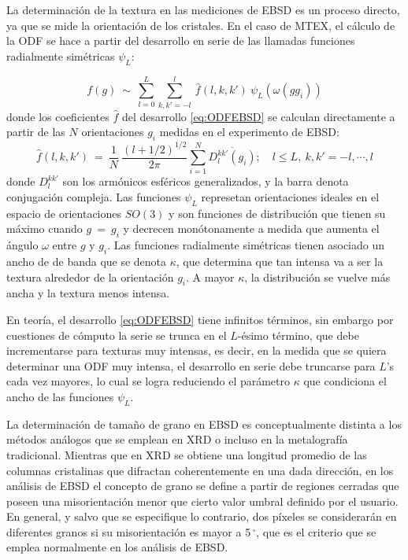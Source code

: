 La determinación de la textura en las mediciones de EBSD es un proceso directo, ya que se mide la orientación de los cristales.
En el caso de MTEX, el cálculo de la ODF se hace a partir del desarrollo en serie de las llamadas funciones radialmente simétricas $\psi_L$:

\begin{equation}
  f(g) \ \sim \ \sum_{l=0}^{L} \sum_{k,k'=-l}^{l} \ \hat{f}(l, k, k') \ \psi_L(\omega(gg_i)) 
  \label{eq:ODFEBSD}
\end{equation}
\noindent
donde los coeficientes $\hat{f}$ del desarrollo \ref{eq:ODFEBSD} se calculan directamente a partir de las $N$ orientaciones $g_i$ medidas en el experimento de EBSD:
\begin{equation}
  \hat{f}(l, k, k') \ = \ \frac{1}{N} \ \frac{(l + 1/2)^{1/2}}{2 \pi} \sum_{i=1}^{N} \overline{D_l^{k k'} (g_i)}; \quad l \leq L, \ k, k' = -l, \cdots, l
  \label{eq:ODFcoef}
\end{equation}
\noindent
donde $D_l^{k k'}$ son los armónicos esféricos generalizados, y la barra denota conjugación compleja. Las funciones $\psi_L$ represetan orientaciones ideales en el espacio de orientaciones $SO(3)$ y son funciones de distribución que tienen su máximo cuando $g \ = \ g_i$ y decrecen monótonamente a medida que aumenta el ángulo $\omega$ entre $g$ y $g_i$.
Las funciones radialmente simétricas tienen asociado un ancho de de banda que se denota $\kappa$, que determina que tan intensa va a ser la textura alrededor de la orientación $g_i$.
A mayor $\kappa$, la distribución se vuelve más ancha y la textura menos intensa.

En teoría, el desarrollo \ref{eq:ODFEBSD} tiene infinitos términos, sin embargo por cuestiones de cómputo la serie se trunca en el $L$-ésimo término, que debe incrementarse para texturas muy intensas, es decir, en la medida que se quiera determinar una ODF muy intensa, el desarrollo en serie debe truncarse para $L$'s cada vez mayores, lo cual se logra reduciendo el parámetro $\kappa$ que condiciona el ancho de las funciones $\psi_L$.

La determinación de tamaño de grano en EBSD es conceptualmente distinta a los métodos análogos que se emplean en XRD o incluso en la metalografía tradicional.
Mientras que en XRD se obtiene una longitud promedio de las columnas cristalinas que difractan coherentemente en una dada dirección, en los análisis de EBSD el concepto de grano se define a partir de regiones cerradas que poseen una misorientación menor que cierto valor umbral definido por el usuario.
En general, y salvo que se especifique lo contrario, dos píxeles se considerarán en diferentes granos si su misorientación es mayor a 5\,$^{\circ}$, que es el criterio que se emplea normalmente en los análisis de EBSD.

